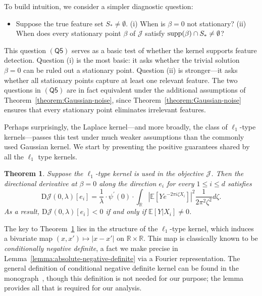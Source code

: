 \documentclass[sn-mathphys-num]{sn-jnl}%
\numberwithin{equation}{section}
\newcommand{\R}{\mathbb{R}}
\newcommand{\E}{\mathbb{E}}
\newcommand{\profile}{\psi}
\newcommand{\supp}{\mathop{\rm supp}}
\theoremstyle{thmstyleone}%
\newtheorem{theorem}{Theorem}%
\theoremstyle{thmstyletwo}%
\theoremstyle{thmstylethree}%
\begin{document}
To build intuition, we consider a simpler diagnostic question:

\vspace{0.5em}
\begin{itemize}
\item[$\mathsf{(Q5)}$]  Suppose the true feature set $S_* \neq \emptyset$. (i) When is $\beta = 0$ not stationary? (ii) When does every stationary point $\beta$ of $\mathcal{J}$ satisfy $\supp(\beta) \cap S_* \neq \emptyset$?
\end{itemize} 

\vspace{0.5em}
This question $(\mathsf{Q5})$ serves as a basic test of whether the kernel supports feature detection. Question (i) is the most basic: it asks whether the trivial solution $\beta = 0$ can be ruled out a stationary point. Question (ii) is stronger---it asks whether all stationary points capture at least one relevant feature.  The two questions in $(\mathsf{Q5})$ are in fact equivalent under the additional assumptions of Theorem~\ref{theorem:Gaussian-noise}, since Theorem~\ref{theorem:Gaussian-noise} ensures that every stationary point eliminates irrelevant features.


Perhaps surprisingly, the Laplace kernel---and more broadly, the class of $\ell_1$-type kernels---passes this test under much weaker assumptions than the commonly used Gaussian kernel. 
We start by presenting the positive guarantees shared by all the $\ell_1$ type kernels. 

\vspace{0.5em} 
\begin{theorem}
\label{proposition:why-Laplace-kernel-is-good}
Suppose the $\ell_1$-type kernel is used in the objective $\mathcal{J}$. Then the directional derivative 
at $\beta = 0$ along the direction $e_i$ for every $1 \le i \le d$ satisfies 
\begin{equation*}
	\mathrm{D}\mathcal{J}(0, \lambda)[e_i]
		= \frac{1}{\lambda} \cdot \profile^\prime(0) \cdot \int_\R \left|\E[Y e^{-2\pi i \zeta X_i}]\right|^2 \frac{1}{2\pi^2 \zeta^2} d\zeta. 
\end{equation*}
As a result, $\mathrm{D}\mathcal{J}(0, \lambda)[e_i] < 0$ if and only if $\E[Y|X_i] \neq 0$. 
\end{theorem} 

\vspace{.7em} 
The key to Theorem~\ref{proposition:why-Laplace-kernel-is-good} lies in the structure of the $\ell_1$-type kernel, which induces a bivariate map $(x, x') \mapsto |x - x'|$ on $\R \times \R$. This map is classically known to be \emph{conditionally negative definite}, a fact we make precise in Lemma~\ref{lemma:absolute-negative-definite} via a Fourier representation. The general definition of conditional negative definite kernel can be found in the monograph~\cite{Wendland04}, though this definition is not needed for our purpose; the lemma provides all that is required for our analysis.
\end{document}
